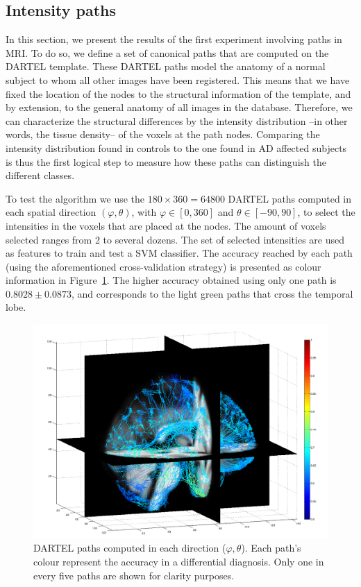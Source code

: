 \subsection{Intensity paths}\label{sec:intensity}
In this section, we present the results of the first experiment involving paths in MRI. To do so, we define a set of canonical paths that are computed on the DARTEL template. These DARTEL paths model the anatomy of a normal subject to whom all other images have been registered. This means that we have fixed the location of the nodes to the structural information of the template, and by extension, to the general anatomy of all images in the database. Therefore, we can characterize the structural differences by the intensity distribution --in other words, the tissue density--  of the voxels at the path nodes. Comparing the intensity distribution found in controls to the one found in AD affected subjects is thus the first logical step to measure how these paths can distinguish the different classes.

To test the algorithm we use the $180\times360=64800$ DARTEL paths computed in each spatial direction $(\varphi,\theta)$, with $\varphi\in[0,360]$ and $\theta\in[-90,90]$, to select the intensities in the voxels that are placed at the nodes. The amount of voxels selected ranges from 2 to several dozens. The set of selected intensities are used as features to train and test a SVM classifier. The accuracy reached by each path (using the aforementioned cross-validation strategy) is presented as colour information in Figure~\ref{fig:accuracyMap}. The higher accuracy obtained using only one path is $0.8028\pm0.0873$, and corresponds to the light green paths that cross the temporal lobe. 

\begin{figure}
	\begin{center}
		\includegraphics[width=\columnwidth]{Graphics/ch6/accuracyPaths2}
		\caption{DARTEL paths computed in each direction ($\varphi,\theta$). Each path's colour represent the accuracy in a differential diagnosis. Only one in every five paths are shown for clarity purposes.}
		\label{fig:accuracyMap}
	\end{center}
\end{figure}

